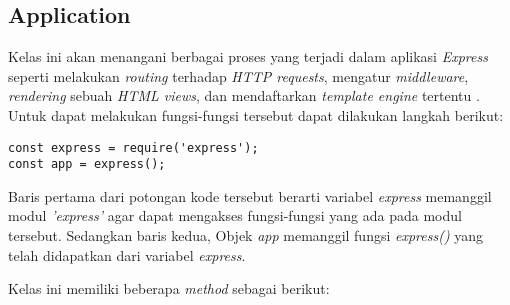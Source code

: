 \subsection{Application}
Kelas ini akan menangani berbagai proses yang terjadi dalam aplikasi \textit{Express} seperti melakukan \textit{routing} terhadap \textit{HTTP requests}, mengatur \textit{middleware}, \textit{rendering} sebuah \textit{HTML views}, dan mendaftarkan \textit{template engine} tertentu \cite{tj:10:expressjsdocs}. Untuk dapat melakukan fungsi-fungsi tersebut dapat dilakukan langkah berikut:

\begin{lstlisting}
const express = require('express');
const app = express();
\end{lstlisting}

Baris pertama dari potongan kode tersebut berarti variabel \textit{express} memanggil modul \textit{'express'} agar dapat mengakses fungsi-fungsi yang ada pada modul tersebut. Sedangkan baris kedua, Objek \textit{app} memanggil fungsi \textit{express()} yang telah didapatkan dari variabel \textit{express}.

Kelas ini memiliki beberapa \textit{method} sebagai berikut:


